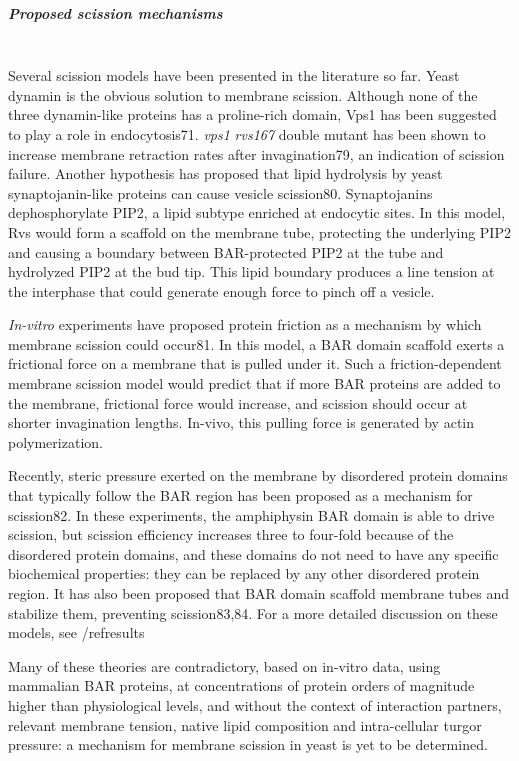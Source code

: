 		
			\subparagraph{Proposed scission mechanisms}
			\mbox{}\\
			Several scission models have been presented in the literature so far. Yeast dynamin is the obvious solution to membrane scission. Although none of the three dynamin-like proteins has a proline-rich domain, Vps1 has been suggested to play a role in endocytosis71. \textit{vps1\textDelta} \textit{rvs167\textDelta}  double mutant has been shown to increase membrane retraction rates after invagination79, an indication of scission failure. Another hypothesis has proposed that lipid hydrolysis by yeast synaptojanin-like proteins can cause vesicle scission80. Synaptojanins dephosphorylate PIP2, a lipid subtype enriched at endocytic sites. In this model, Rvs would form a scaffold on the membrane tube, protecting the underlying PIP2 and causing a boundary between BAR-protected PIP2 at the tube and hydrolyzed PIP2 at the bud tip. This lipid boundary produces a line tension at the interphase that could generate enough force to pinch off a vesicle. 
			
			\vspace{5mm}
			\textit{In-vitro} experiments have proposed protein friction as a mechanism by which membrane scission could occur81. In this model, a BAR domain scaffold exerts a frictional force on a membrane that is pulled under it. Such a friction-dependent membrane scission model would predict that if more BAR proteins are added to the membrane, frictional force would increase, and scission should occur at shorter invagination lengths. In-vivo, this pulling force is generated by actin polymerization. 


			\vspace{5mm}
			Recently, steric pressure exerted on the membrane by disordered protein domains that typically follow the BAR region has been proposed as a mechanism for scission82. In these experiments, the amphiphysin BAR domain is able to drive scission, but scission efficiency increases three to four-fold because of the disordered protein domains, and these domains do not need to have any specific biochemical properties: they can be replaced by any other disordered protein region. It has also been proposed that BAR domain scaffold membrane tubes and stabilize them, preventing scission83,84. For a more detailed discussion on these models, see /ref{results}


			\vspace{5mm}
			Many of these theories are contradictory, based on in-vitro data, using mammalian BAR proteins, at concentrations of protein orders of magnitude higher than physiological levels, and without the context of interaction partners, relevant membrane tension, native lipid composition and intra-cellular turgor pressure: a mechanism for membrane scission in yeast is yet to be determined. 


